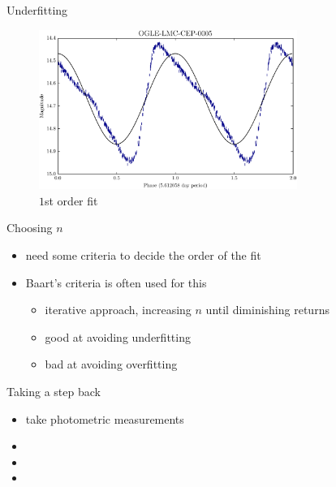 \documentclass{beamer}
\begin{document}
\begin{frame}{Underfitting}
  \begin{figure}[h]
    \centering
    \includegraphics[width=0.75\textwidth]{img/fits/OGLE-LMC-CEP-0005-degree2}
    \caption*{$1$st order fit}
  \end{figure}
\end{frame}

\begin{frame}{Choosing $n$}
  \begin{itemize}
  \item need some criteria to decide the order of the fit
  \item Baart's criteria is often used for this
    \begin{itemize}
    \item iterative approach, increasing $n$ until diminishing returns
    \item good at avoiding underfitting
    \item bad at avoiding overfitting
    \end{itemize}
  \end{itemize}
\end{frame}

\begin{frame}{Taking a step back}
  \begin{itemize}
  \item take photometric measurements
  \item {}
  \item {}
  \item {}
  \end{itemize}
\end{frame}
\end{document}
